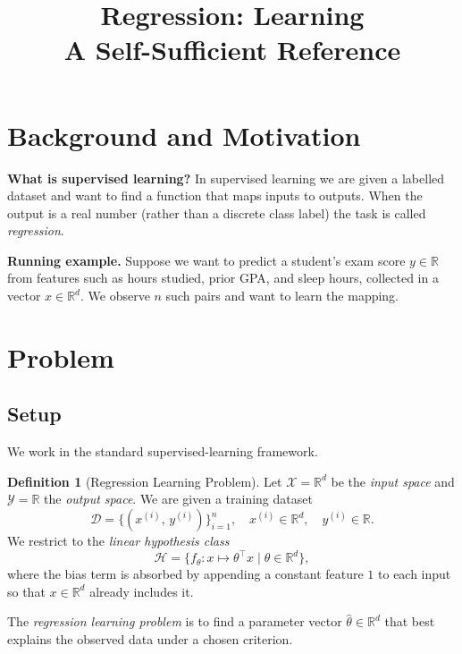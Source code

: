 \documentclass[11pt]{article}
\theoremstyle{definition}
\newtheorem{definition}[theorem]{Definition}
\theoremstyle{remark}
\newcommand{\R}{\mathbb{R}}
\newcommand{\T}{^{\top}}
\begin{document}
\title{\textbf{Regression: Learning}\\[0.4em]
       \large A Self-Sufficient Reference}
\author{}
\date{}
\maketitle
\tableofcontents
\newpage

\section{Background and Motivation}

\textbf{What is supervised learning?}
In supervised learning we are given a labelled dataset and want to find a
function that maps inputs to outputs.  When the output is a real number (rather
than a discrete class label) the task is called \emph{regression}.

\textbf{Running example.}
Suppose we want to predict a student's exam score $y \in \R$ from features
such as hours studied, prior GPA, and sleep hours, collected in a vector
$x \in \R^{d}$.  We observe $n$ such pairs and want to learn the mapping.

\section{Problem}

\subsection{Setup}

We work in the standard supervised-learning framework.

\begin{definition}[Regression Learning Problem]
    Let $\mathcal{X} = \R^{d}$ be the \emph{input space} and
    $\mathcal{Y} = \R$ the \emph{output space}.
    We are given a training dataset
    \[
        \mathcal{D} = \bigl\{(x^{(i)},\, y^{(i)})\bigr\}_{i=1}^{n},
        \quad x^{(i)} \in \R^{d},\quad y^{(i)} \in \R.
    \]
    We restrict to the \emph{linear hypothesis class}
    \[
        \mathcal{H} = \bigl\{f_{\theta} : x \mapsto \theta\T x \;\big|\; \theta \in \R^{d}\bigr\},
    \]
    where the bias term is absorbed by appending a constant feature $1$ to each
    input so that $x \in \R^{d}$ already includes it.

    The \emph{regression learning problem} is to find a parameter vector
    $\hat{\theta} \in \R^{d}$ that best explains the observed data under a
    chosen criterion.
\end{definition}
\end{document}
